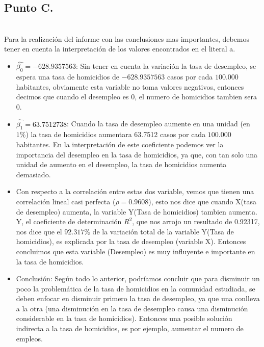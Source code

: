 \documentclass[letterpaper,12pt,onecolumn,titlepage]{article}
\begin{document}
\subsection{Punto C.}
~\\ Para la realizaci\'{o}n del informe con las conclusiones mas importantes, debemos tener en cuenta la interpretaci\'{o}n de los valores encontrados en el literal a.
\begin{itemize}
\item $\hat{\beta_{0}}=-628.9357563$: Sin tener en cuenta la variaci\'{o}n la tasa de desempleo, se espera una tasa de homicidios de $-628.9357563$ casos por cada $100.000$ habitantes, obviamente esta variable no toma valores negativos, entonces decimos que cuando el desempleo es 0, el numero de homicidios tambien sera 0.
\item $\hat{\beta_{1}}=63.7512738$: Cuando la tasa de desempleo aumente en una unidad (en $1\%$) la tasa de homicidios aumentara 63.7512 casos por cada $100.000$ habitantes. En la interpretaci\'{o}n de este coeficiente podemos ver la importancia del desempleo en la tasa de homicidios, ya que, con tan solo una unidad de aumento en el desempleo, la tasa de homicidios aumenta demasiado.
\item Con respecto a la correlaci\'{o}n entre estas dos variable, vemos que tienen una correlaci\'{o}n lineal casi perfecta ($\rho=0.9608$), esto nos dice que cuando X(tasa de desempleo) aumenta, la variable Y(Tasa de homicidios) tambien aumenta. Y, el coeficiente de determinaci\'{o}n $R^2$, que nos arrojo un resultado de 0.92317, nos dice que el $92.317\%$ de la variaci\'{o}n total de la variable Y(Tasa de homicidios), es explicada por la tasa de desempleo (variable X). Entonces concluimos que esta variable (Desempleo) es muy influyente e importante en la tasa de homicidios.
\item Conclusi\'{o}n: Seg\'{u}n todo lo anterior, podr\'{i}amos concluir que para disminuir un poco la problem\'{a}tica de la tasa de homicidios en la comunidad estudiada, se deben enfocar en disminuir primero la tasa de desempleo, ya que una conlleva a la otra (una disminuci\'{o}n en la tasa de desempleo causa una disminuci\'{o}n considerable en la tasa de homicidios). Entonces una posible soluci\'{o}n indirecta a la tasa de homicidios, es por ejemplo, aumentar el numero de empleos.
\end{itemize}

\end{document}
